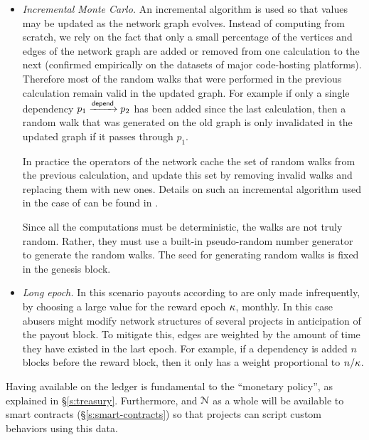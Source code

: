 \begin{itemize}
\item \emph{Incremental Monte Carlo.} An incremental algorithm is used so that
  \osrank{} values may be updated as the network graph evolves. Instead of
  computing \osrank{} from scratch, we rely on the fact that only a small
  percentage of the vertices and edges of the network graph are added or removed
  from one calculation to the next (confirmed empirically on the datasets of
  major code-hosting platforms). Therefore most of the random walks that were
  performed in the previous calculation remain valid in the updated graph. For
  example if only a single dependency $p_1 \xrightarrow[]{\mathsf{depend}} p_2$ has been
  added since the last calculation, then a random walk that was generated on the
  old graph is only invalidated in the updated graph if it passes through $p_1$.

  In practice the operators of the network cache the set of random
  walks from the previous calculation, and update this set by removing
  invalid walks and replacing them with new ones. Details on such an
  incremental algorithm used in the case of \pagerank{} can be found
  in \cite{incr pagerank}.

  Since all the computations must be deterministic, the walks are not
  truly random. Rather, they must use a built-in pseudo-random number
  generator to generate the random walks. The seed for generating
  random walks is fixed in the genesis block.


\item \emph{Long epoch.} In this scenario payouts according to
  \osrank{} are only made infrequently, by choosing a large value for the
  reward epoch $\kappa$, \eg{} monthly.  In this case
  abusers might modify network structures of several projects in
  anticipation of the payout block. To mitigate this, edges are
  weighted by the amount of time they have existed in the last epoch. For
  example, if a dependency is added $n$ blocks before the reward block,
  then it only has a weight proportional to $n/\kappa$.
\end{itemize}

\bigskip

\noindent Having \osrank{} available on the ledger is fundamental to the \oscoin{}
``monetary policy'', as explained in \S \ref{s:treasury}. Furthermore,
\osrank{} and $\mathcal{N}$ as a whole will be available to smart contracts
(\S\ref{s:smart-contracts}) so that projects can script custom behaviors using
this data.
